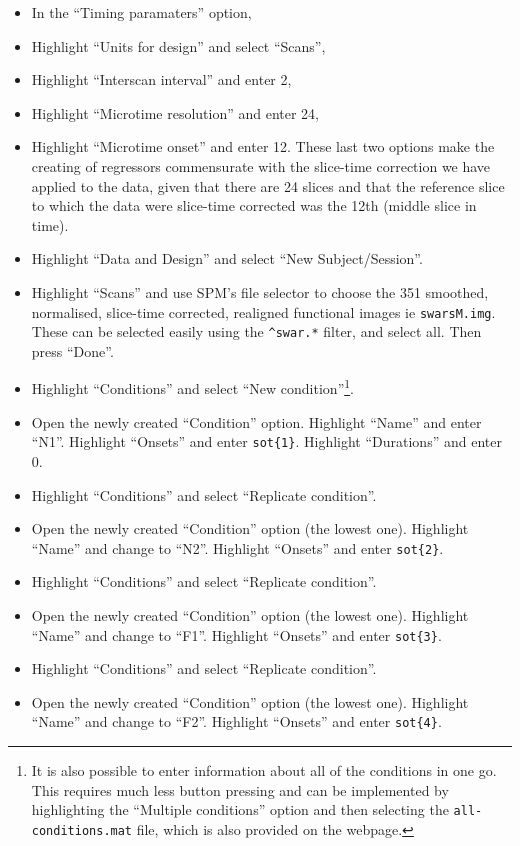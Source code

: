 \begin{itemize}
\item In the ``Timing paramaters'' option,
\item Highlight ``Units for design'' and select ``Scans'',
\item Highlight ``Interscan interval'' and enter 2,
\item Highlight ``Microtime resolution'' and enter 24,
\item Highlight ``Microtime onset'' and enter 12. These last two options make the creating of regressors commensurate with the slice-time correction we have applied to the data, given that there are 24 slices and that the reference slice to which the data were slice-time corrected was the 12th (middle slice in time).
\item Highlight ``Data and Design'' and select ``New Subject/Session''.
\item Highlight ``Scans'' and use SPM's file selector to choose the 351 smoothed, normalised, slice-time corrected, realigned functional images ie \texttt{swarsM.img}. These can be selected easily using the \texttt{\textasciicircum swar.*} filter, and select all. Then press ``Done''.
\item Highlight ``Conditions'' and select ``New condition''\footnote{It is also possible to enter information about all of the conditions in one go. This requires much less button pressing and can be implemented by highlighting the ``Multiple conditions'' option and then selecting the \texttt{all-conditions.mat} file, which is also provided on the webpage.}.
\item Open the newly created ``Condition'' option. Highlight ``Name'' and enter ``N1''. Highlight ``Onsets'' and enter \texttt{sot\{1\}}. Highlight ``Durations'' and enter 0.
\item Highlight ``Conditions'' and select ``Replicate condition''.
\item Open the newly created ``Condition'' option (the lowest one). Highlight ``Name'' and change to ``N2''. Highlight ``Onsets'' and enter \texttt{sot\{2\}}.
\item Highlight ``Conditions'' and select ``Replicate condition''.
\item Open the newly created ``Condition'' option (the lowest one). Highlight ``Name'' and change to ``F1''. Highlight ``Onsets'' and enter \texttt{sot\{3\}}.
\item Highlight ``Conditions'' and select ``Replicate condition''.
\item Open the newly created ``Condition'' option (the lowest one). Highlight ``Name'' and change to ``F2''. Highlight ``Onsets'' and enter \texttt{sot\{4\}}.

\end{itemize}
